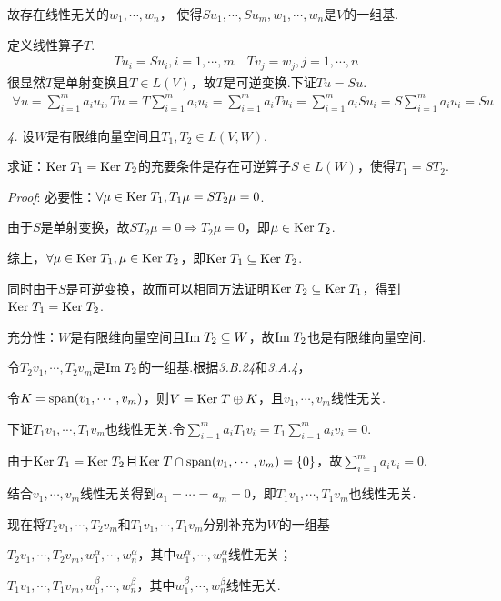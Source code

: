 故存在线性无关的\(w_1,\cdots,w_n\)， 使得\(Su_1,\cdots,Su_m,w_1,\cdots,w_n\)是\(V\)的一组基.

定义线性算子\(T\).
    \begin{align*}
        Tu_i=Su_i,i=1,\cdots,m \quad Tv_j=w_j,j=1,\cdots,n
    \end{align*}
很显然\(T\)是单射变换且\(T \in L(V)\)，故\(T\)是可逆变换.下证\(Tu=Su\).
    \begin{align*}
        \forall u=\sum_{i=1}^m a_iu_i,Tu=T\sum_{i=1}^m a_iu_i
        =\sum_{i=1}^m a_iTu_i=\sum_{i=1}^m a_iSu_i=S\sum_{i=1}^m a_iu_i=Su
    \end{align*}

\newpage

\textit{4.}
设\(W\)是有限维向量空间且\(T_1,T_2 \in L(V,W)\).

求证：\(\mathrm{Ker \;} T_1=\mathrm{Ker \;} T_2\)的充要条件是存在可逆算子\(S \in L(W)\)，使得\(T_1=ST_2\).

\textit{Proof}:
必要性：\(\forall \mu \in \mathrm{Ker \;} T_1,T_1 \mu=ST_2 \mu =0\).

由于\(S\)是单射变换，故\(ST_2 \mu =0 \Rightarrow T_2 \mu =0\)，即\(\mu \in \mathrm{Ker \;} T_2\).

综上，\(\forall \mu \in \mathrm{Ker \;} T_1, \mu \in \mathrm{Ker \;} T_2\)，即\(\mathrm{Ker \;} T_1 \subseteq \mathrm{Ker \;} T_2\).

同时由于\(S\)是可逆变换，故而可以相同方法证明\(\mathrm{Ker \;} T_2 \subseteq \mathrm{Ker \;} T_1\)，得到\(\mathrm{Ker \;} T_1=\mathrm{Ker \;} T_2\).

充分性：\(W\)是有限维向量空间且\(\mathrm{Im \;} T_2 \subseteq W\)，故\(\mathrm{Im \;} T_2\)也是有限维向量空间.

令\(T_2v_1,\cdots,T_2v_m\)是\(\mathrm{Im \;} T_2\)的一组基.根据\textit{3.B.24}和\textit{3.A.4}，

令\(K=\mathrm{span} (v_1,\cdots,v_m)\)，则\(V=\mathrm{Ker \;} T \oplus K\)，且\(v_1,\cdots,v_m\)线性无关.

下证\(T_1v_1,\cdots,T_1v_m\)也线性无关.令\(\sum_{i=1}^m a_iT_1v_i=T_1\sum_{i=1}^m a_iv_i=0\).

由于\(\mathrm{Ker \;} T_1=\mathrm{Ker \;} T_2\)且\(\mathrm{Ker \;} T \cap \mathrm{span} (v_1,\cdots,v_m)=\{0\}\)，故\(\sum_{i=1}^m a_iv_i=0\).

结合\(v_1,\cdots,v_m\)线性无关得到\(a_1=\cdots=a_m=0\)，即\(T_1v_1,\cdots,T_1v_m\)也线性无关.

现在将\(T_2v_1,\cdots,T_2v_m\)和\(T_1v_1,\cdots,T_1v_m\)分别补充为\(W\)的一组基

\(T_2v_1,\cdots,T_2v_m,w_1^\alpha,\cdots,w_n^\alpha\)，其中\(w_1^\alpha,\cdots,w_n^\alpha\)线性无关；

\(T_1v_1,\cdots,T_1v_m,w_1^\beta,\cdots,w_n^\beta\)，其中\(w_1^\beta,\cdots,w_n^\beta\)线性无关.

